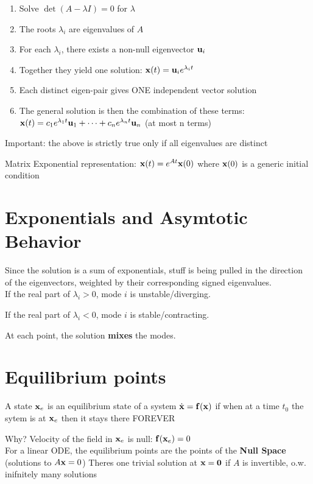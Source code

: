 \documentclass{report}
\begin{document}
\begin{enumerate}
    \item Solve $\det(A - \lambda I) = 0$ for $\lambda$
    \item The roots $\lambda_i$ are eigenvalues of $A$
    \item For each $\lambda_i$, there exists a non-null eigenvector 
    $\mathbf{u}_i$ 
    \item Together they yield one solution: $\mathbf{x}(t) = \mathbf{u}_i e^{\lambda_i t}$
    \item Each distinct eigen-pair gives ONE independent vector solution
    \item The general solution is then the combination of these terms: 
    $\mathbf{x}(t) = c_1 e^{\lambda_1 t} \mathbf{u}_1 + \dots + c_n e^{\lambda_n t} \mathbf{u}_n$ (at most n terms)
\end{enumerate}

Important: the above is strictly true only if all eigenvalues are distinct

Matrix Exponential representation: $\mathbf{x}(t) = e^{A t} \mathbf{x}(0)$ where $\mathbf{x}(0)$ is a generic initial condition

\section*{Exponentials and Asymtotic Behavior}

Since the solution is a sum of exponentials, stuff is being pulled in the direction of the eigenvectors, 
weighted by their corresponding signed eigenvalues.
\\

If the real part of $\lambda_i > 0$, mode $i$ is unstable/diverging.

If the real part of $\lambda_i < 0$, mode $i$ is stable/contracting.

At each point, the solution \textbf{mixes} the modes.

\section*{Equilibrium points}

A state $\mathbf{x}_e$ is an equilibrium state of a system $\dot{\mathbf{x}} = \mathbf{f}(\mathbf{x})$ if 
when at a time $t_0$ the sytem is at $\mathbf{x}_e$ then it stays there FOREVER

Why? Velocity of the field in $\mathbf{x}_e$ is null: $\mathbf{f}(\mathbf{x}_e) = 0$
\\

For a linear ODE, the equilibrium points are the points of the \textbf{Null Space} (solutions to $A \mathbf{x} = 0$)
Theres one trivial solution at $\mathbf{x} = \mathbf{0}$ if $A$ is invertible, o.w. inifnitely many solutions
\end{document}
